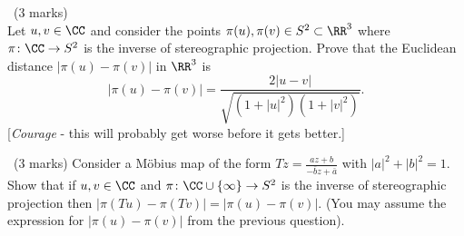 \documentclass[12pt]{article}
\begin{document}
\newpage

\begin{question}\ (3 marks)\\
  Let $u,v\in\CC$ and consider the points $\pi(u),\pi(v)\in S^2\subset\RR^3$ where $\pi\colon\CC\to S^2$ is the inverse of stereographic projection. Prove that the Euclidean distance $|\pi(u)-\pi(v)|$ in $\RR^3$ is
  \[|\pi(u)-\pi(v)|=\frac{2|u-v|}{\sqrt{(1+|u|^2)(1+|v|^2)}}.\]
  [{\em Courage} - this will probably get worse before it gets better.]
\end{question}

\iffalse
\begin{answer}
  We have $\pi(u)=\left(\frac{2u}{1+|u|^2},\frac{1-|u|^2}{1+|u|^2}\right)$ so
  \begin{align*}
    |\pi(u)-\pi(v)|&=\left|\frac{2u}{1+|u|^2}-\frac{2v}{1+|v|^2}\right|^2+\left(\frac{1-|u|^2}{1+|u|^2}-\frac{1-|v|^2}{1+|v|^2}\right)^2\\
    &=\frac{1}{(1+|u|^2)^2(1+|v|^2)^2}\left(4\left|u(1+|v|^2)-v(1+|u|^2)\right|^2+\right.\\
    &\left.\ \ \ \ \ \ +\left((1-|u|^2)(1+|v|^2)-(1+|u|^2)(1-|v|^2)\right)^2\right)\\
    &=\frac{4}{(1+|u|^2)^2(1+|v|^2)^2}\left(|u|^2(1+|v|^2)^2+|v|^2(1+|u|^2)-\right.\\
    &\left.\ \ \ \ \ \ -(\bar{u}v+u\bar{v})(1+|u|^2)(1+|v|^2)+\left(|v|^2-|u|^2\right)^2\right)\\
    &=\frac{4}{(1+|u|^2)^2(1+|v|^2)^2}\left((|u|^2+|v|^2)(1+|u|^2)(1+|v|^2)-\right.\\
    &\left.\ \ \ \ \ \ -(\bar{u}v+u\bar{v})(1+|u|^2)(1+|v|^2)\right)\\
    &=\frac{4|u-v|^2}{(1+|u|^2)(1+|v|^2)}
  \end{align*}
  and taking square roots gives the answer.
\end{answer}
\newpage
\fi

\vspace{1cm}

\begin{question}\ (3 marks)
Consider a M\"obius map of the form $Tz=\frac{az+b}{-\bar{b}z+\bar{a}}$ with $|a|^2+|b|^2=1$. Show that if $u,v\in\CC$ and $\pi\colon\CC\cup\{\infty\}\to S^2$ is the inverse of stereographic projection then $|\pi(Tu)-\pi(Tv)|=|\pi(u)-\pi(v)|$. (You may assume the expression for $|\pi(u)-\pi(v)|$ from the previous question).
\end{question}
\end{document}
